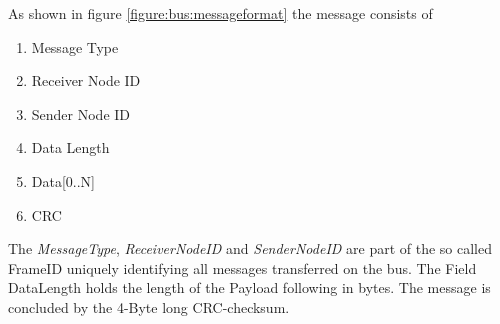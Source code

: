 \documentclass[11pt,a4paper,oneside]{report}
\begin{document}
As shown in figure \ref{figure:bus:messageformat} the message consists of

\begin{enumerate}
 \item Message Type 
 \item Receiver Node ID
 \item Sender Node ID
 \item Data Length
 \item Data[0..N]
 \item CRC
\end{enumerate}

The \textit{MessageType}, \textit{ReceiverNodeID} and \textit{SenderNodeID} are part of the so called FrameID uniquely identifying all messages transferred on the bus.
The Field DataLength holds the length of the Payload following in bytes. The message is concluded by the 4-Byte long CRC-checksum.

% 
% 
% 
% 
% 
% 
% 
% 
% 
% 
% 
% 
% 
% 
% 
\end{document}
